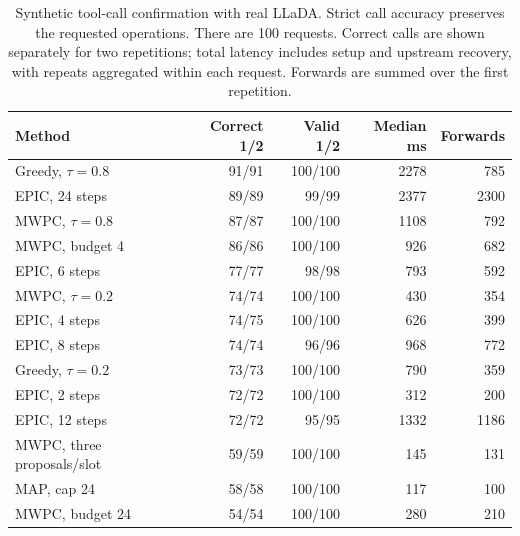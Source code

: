 \begin{table}[ht]
\centering\small
\caption{Synthetic tool-call confirmation with real LLaDA. Strict call accuracy preserves the requested operations. There are 100 requests. Correct calls are shown separately for two repetitions; total latency includes setup and upstream recovery, with repeats aggregated within each request. Forwards are summed over the first repetition.}
\label{tab:live-synthetic}
\begin{tabular}{lrrrr}
\toprule
Method & Correct 1/2 & Valid 1/2 & Median ms & Forwards \\
\midrule
Greedy, $\tau=0.8$ & 91/91 & 100/100 & 2278 & 785 \\
EPIC, 24 steps & 89/89 & 99/99 & 2377 & 2300 \\
MWPC, $\tau=0.8$ & 87/87 & 100/100 & 1108 & 792 \\
MWPC, budget 4 & 86/86 & 100/100 & 926 & 682 \\
EPIC, 6 steps & 77/77 & 98/98 & 793 & 592 \\
MWPC, $\tau=0.2$ & 74/74 & 100/100 & 430 & 354 \\
EPIC, 4 steps & 74/75 & 100/100 & 626 & 399 \\
EPIC, 8 steps & 74/74 & 96/96 & 968 & 772 \\
Greedy, $\tau=0.2$ & 73/73 & 100/100 & 790 & 359 \\
EPIC, 2 steps & 72/72 & 100/100 & 312 & 200 \\
EPIC, 12 steps & 72/72 & 95/95 & 1332 & 1186 \\
MWPC, three proposals/slot & 59/59 & 100/100 & 145 & 131 \\
MAP, cap 24 & 58/58 & 100/100 & 117 & 100 \\
MWPC, budget 24 & 54/54 & 100/100 & 280 & 210 \\
\bottomrule
\end{tabular}
\end{table}
